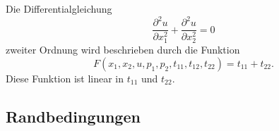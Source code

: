 \begin{beispiel}
Die Differentialgleichung
\[
\frac{\partial^2 u}{\partial x_1^2}
+
\frac{\partial^2 u}{\partial x_2^2}
=
0
\]
zweiter Ordnung wird beschrieben durch die Funktion
\[
F(x_1,x_2,u,p_1,p_2,t_{11},t_{12},t_{22})
=
t_{11} + t_{22}.
\]
Diese Funktion ist linear in $t_{11}$ und $t_{22}$.
\end{beispiel}

\subsection{Randbedingungen
\label{subsection:pde:randbedingungen}}







